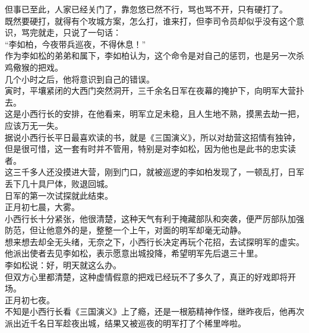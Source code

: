 \begin{multicols}{\theparacolNo}
但事已至此，人家已经关门了，靠忽悠已然不行，骂也骂不开，只有硬打了。\\

既然要硬打，就得有个攻城方案，怎么打，谁来打，但李司令员却似乎没有这个意识，骂完就走，只说了一句话：\\

“李如柏，今夜带兵巡夜，不得休息！”\\

作为李如松的弟弟和属下，李如柏认为，这个命令是对自己的惩罚，也是另一次杀鸡儆猴的把戏。\\

几个小时之后，他将意识到自己的错误。\\

寅时，平壤紧闭的大西门突然洞开，三千余名日军在夜幕的掩护下，向明军大营扑去。\\

这是小西行长的安排，在他看来，明军立足未稳，且人生地不熟，摸黑去劫一把，应该万无一失。\\

据说小西行长平日最喜欢读的书，就是《三国演义》，所以对劫营这招情有独钟，但是很可惜，这一套有时并不管用，特别是对李如松，因为他也是此书的忠实读者。\\

这三千多人还没摸进大营，刚到门口，就被巡逻的李如柏发现了，一顿乱打，日军丢下几十具尸体，败退回城。\\

日军的第一次试探就此结束。\\

正月初七晨，大雾。\\

小西行长十分紧张，他很清楚，这种天气有利于掩藏部队和突袭，便严厉部队加强防范，但让他意外的是，整整一个上午，对面的明军却毫无动静。\\

想来想去却全无头绪，无奈之下，小西行长决定再玩个花招，去试探明军的虚实。\\

他派出使者去见李如松，表示愿意出城投降，希望明军先后退三十里。\\

李如松说：好，明天就这么办。\\

但双方心里都清楚，这种虚情假意的把戏已经玩不了多久了，真正的好戏即将开场。\\

正月初七夜。\\

不知是小西行长看《三国演义》上了瘾，还是一根筋精神作怪，继昨夜后，他再次派出近千名日军趁夜出城，结果又被巡夜的明军打了个稀里哗啦。\\


\end{multicols}

